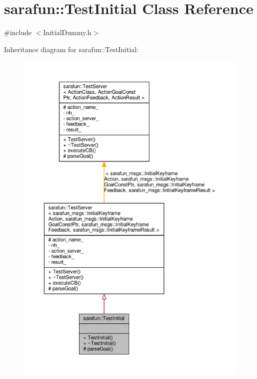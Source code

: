 \hypertarget{classsarafun_1_1TestInitial}{\section{sarafun\-:\-:Test\-Initial Class Reference}
\label{classsarafun_1_1TestInitial}
}


{\ttfamily \#include $<$Initial\-Dummy.\-h$>$}



Inheritance diagram for sarafun\-:\-:Test\-Initial\-:
\nopagebreak
\begin{figure}[H]
\begin{center}
\leavevmode
\includegraphics[width=350pt]{de/df0/classsarafun_1_1TestInitial__inherit__graph}
\end{center}
\end{figure}



